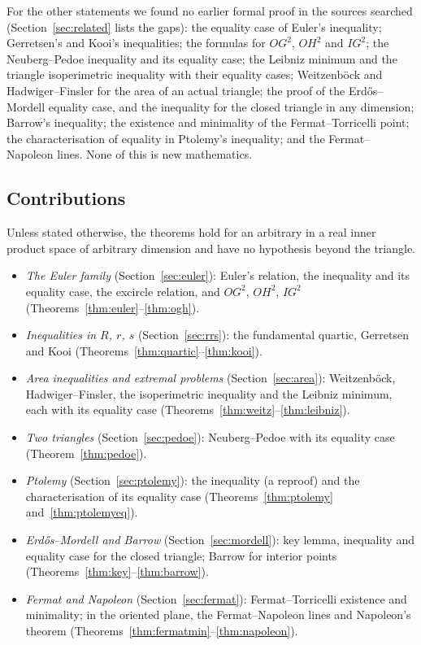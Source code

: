 \documentclass[11pt]{article}
\theoremstyle{definition}
\theoremstyle{remark}
\begin{document}
For the other statements we found no earlier formal proof in the sources searched
(Section~\ref{sec:related} lists the gaps): the equality case of Euler's inequality; Gerretsen's
and Kooi's inequalities; the formulas for $OG^2$, $OH^2$ and $IG^2$; the Neuberg--Pedoe
inequality and its equality case; the Leibniz minimum and the triangle isoperimetric inequality
with their equality cases; Weitzenb\"ock and Hadwiger--Finsler for the area of an actual triangle;
the proof of the Erdős--Mordell equality case, and the inequality for the closed triangle in any
dimension; Barrow's inequality; the existence and minimality of the Fermat--Torricelli point; the
characterisation of equality in Ptolemy's inequality; and the Fermat--Napoleon lines. None of
this is new mathematics.

\subsection{Contributions}
Unless stated otherwise, the theorems hold for an arbitrary  in a real inner
product space of arbitrary dimension and have no hypothesis beyond the triangle.
\begin{itemize}
\item \emph{The Euler family} (Section~\ref{sec:euler}): Euler's relation, the inequality and its
equality case, the excircle relation, and $OG^2$, $OH^2$, $IG^2$
(Theorems~\ref{thm:euler}--\ref{thm:ogh}).
\item \emph{Inequalities in $R$, $r$, $s$} (Section~\ref{sec:rrs}): the fundamental quartic,
Gerretsen and Kooi (Theorems~\ref{thm:quartic}--\ref{thm:kooi}).
\item \emph{Area inequalities and extremal problems} (Section~\ref{sec:area}): Weitzenb\"ock,
Hadwiger--Finsler, the isoperimetric inequality and the Leibniz minimum, each with its equality case
(Theorems~\ref{thm:weitz}--\ref{thm:leibniz}).
\item \emph{Two triangles} (Section~\ref{sec:pedoe}): Neuberg--Pedoe with its equality case
(Theorem~\ref{thm:pedoe}).
\item \emph{Ptolemy} (Section~\ref{sec:ptolemy}): the inequality (a reproof) and the
characterisation of its equality case (Theorems~\ref{thm:ptolemy} and~\ref{thm:ptolemyeq}).
\item \emph{Erdős--Mordell and Barrow} (Section~\ref{sec:mordell}): key lemma, inequality and
equality case for the closed triangle; Barrow for interior points
(Theorems~\ref{thm:key}--\ref{thm:barrow}).
\item \emph{Fermat and Napoleon} (Section~\ref{sec:fermat}): Fermat--Torricelli existence and
minimality; in the oriented plane, the Fermat--Napoleon lines and Napoleon's theorem
(Theorems~\ref{thm:fermatmin}--\ref{thm:napoleon}).
\end{itemize}
\end{document}

